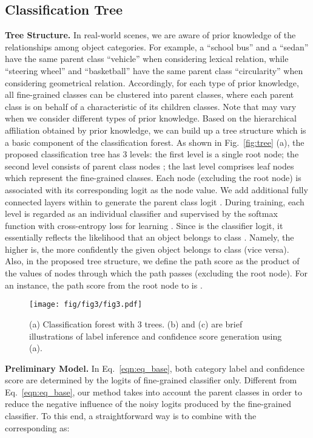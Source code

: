 \documentclass[sigconf]{acmart}
\newcommand{\myparagraph}[1]{{\vspace{0.5em} \noindent \bf #1}}
\begin{document}
\subsection{Classification Tree}
\label{subsec:classification_tree}
\myparagraph{Tree Structure.} In real-world scenes, we are aware of prior knowledge of the relationships among object categories. For example, a ``school bus'' and a ``sedan'' have the same parent class ``vehicle'' when considering lexical relation, while ``steering wheel'' and ``basketball'' have the same parent class ``circularity'' when considering geometrical relation. Accordingly, for each type of prior knowledge, all  fine-grained classes can be clustered into  parent classes, where each parent class is on behalf of a characteristic of its children classes. Note that  may vary when we consider different types of prior knowledge. Based on the hierarchical affiliation obtained by prior knowledge, we can build up a tree structure which is a basic component of the classification forest. As shown in Fig.~\ref{fig:tree} (a), the proposed classification tree has 3 levels: the first level is a single root node; the second level consists of  parent class nodes ; the last level comprises  leaf nodes which represent the fine-grained classes. Each node  (excluding the root node) is associated with its corresponding logit  as the node value. We add additional fully connected layers within  to generate the parent class logit . During training, each level is regarded as an individual classifier and supervised by the softmax function with cross-entropy loss for learning . Since  is the classifier logit, it essentially reflects the likelihood that an object belongs to class . Namely, the higher  is, the more confidently the given object belongs to class  (vice versa).  Also, in the proposed tree structure, we define the path score as the product of the values of nodes through which the path passes (excluding the root node). For an instance, the path score from the root node to  is .

\begin{figure*}
	\centering
	\texttt{[image: fig/fig3/fig3.pdf]}
	\vspace{-6mm}
	\caption{(a) Classification forest with 3 trees. (b) and (c) are brief illustrations of label inference and confidence score generation using (a).}
	\label{fig:forest}
	\vspace{-3mm}
\end{figure*}

\myparagraph{Preliminary Model.} In Eq.~\ref{eqn:eq_base}, both category label and confidence score are determined by the logits of fine-grained classifier only. Different from Eq.~\ref{eqn:eq_base}, our method takes into account the parent classes in order to reduce the negative influence of the noisy logits produced by the fine-grained classifier. To this end, a straightforward way is to combine  with the corresponding  as:
\end{document}
